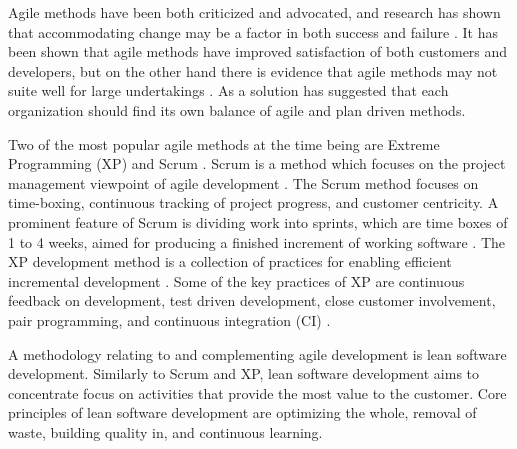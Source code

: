 Agile methods have been both criticized and advocated, and research has shown
that accommodating change may be a factor in both success and failure
\citep{Boehm2002}. It has been shown that agile methods have improved
satisfaction of both customers and developers, but on the other hand there is
evidence that agile methods may not suite well for large undertakings
\citep{Dyba2009}. As a solution \citet{Boehm2002} has suggested that each
organization should find its own balance of agile and plan driven methods.

Two of the most popular agile methods at the time being are Extreme Programming
(XP) and Scrum \citep{Hamed2013}. Scrum is a method which focuses on the project
management viewpoint of agile development \citep{Schwaber2002}. The Scrum method
focuses on time-boxing, continuous tracking of project progress, and customer
centricity. A prominent feature of Scrum is dividing work into sprints, which
are time boxes of 1 to 4 weeks, aimed for producing a finished increment of
working software \citep{Schwaber2002}. The XP development method is a collection
of practices for enabling efficient incremental development \citep{Beck1999}.
Some of the key practices of XP are continuous feedback on development, test
driven development, close customer involvement, pair programming, and continuous
integration (CI) \citep{Beck1999}.

A methodology relating to and complementing agile development is lean software
development. Similarly to Scrum and XP, lean software development aims to
concentrate focus on activities that provide the most value to the customer.
Core principles of lean software development are optimizing the whole, removal
of waste, building quality in, and continuous learning. \citep{Poppendieck2012}




% 
% 
% 


